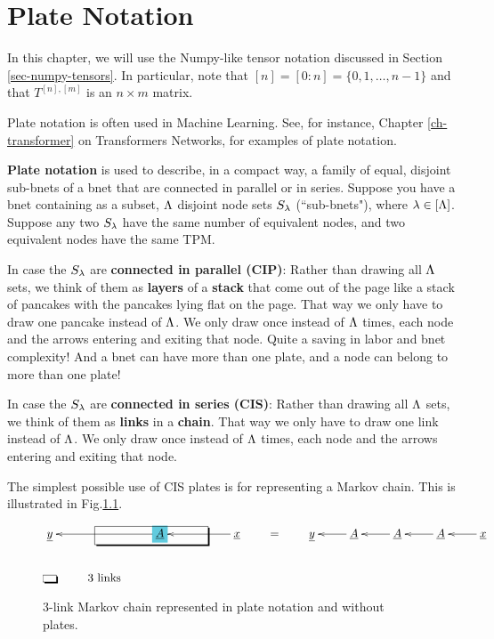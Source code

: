 \chapter{Plate Notation}
\label{ch-plates}

In this chapter, we
will use the Numpy-like tensor notation
discussed in Section 
\ref{sec-numpy-tensors}. In particular, note that $[n] = [0:n] = \{0, 1,\ldots, n-1\}$ and that $T^{[n], [m]}$ is an $n\times m$ matrix.

Plate notation is often used in Machine Learning. See, for instance,
Chapter \ref{ch-transformer} on Transformers Networks, for  examples of plate notation.


{\bf Plate notation} is used to describe, in a compact way, a family of 
equal, disjoint  sub-bnets of a bnet that are connected in parallel or in series.
Suppose you have a bnet containing as a subset, $\Lambda$ disjoint node sets $S_\lambda$ (``sub-bnets"), where
$\lambda\in [\Lambda]$. Suppose
any two $S_\lambda$ have the same number of equivalent nodes,
and two equivalent nodes have the same TPM.

In case the $S_\lambda$ are {\bf connected in parallel (CIP)}:
Rather than drawing all $\Lambda$ sets, 
we think of them as {\bf layers} of a {\bf stack}
that come out of the page like a stack of pancakes with the pancakes
lying flat on the page.
That way we only have to draw one pancake instead of $\Lambda$.
We only draw once instead of $\Lambda$ times, each node and the arrows entering and exiting
that node. Quite a saving in labor and bnet complexity! 
And a bnet can have more 
than one plate, and a node can belong
to more than one plate!

In case the $S_\lambda$ are {\bf connected in series (CIS)}: Rather than drawing all $\Lambda$ sets, 
we think of them as {\bf links} in a {\bf chain}.
That way we only have to draw one link instead of $\Lambda$.
We only draw once instead of $\Lambda$ times, each node and the arrows entering and exiting
that node. 


The simplest possible use
of CIS plates is for representing
a Markov chain. This is
illustrated in  Fig.\ref{fig-texnn-for-markov}.
\begin{figure}[h!]\centering
$$\xymatrix{
{\underline{y}}&&*+[F*:SkyBlue]{\underline{A}}\ar[ll]&&{\underline{x}}\ar[ll]
\save
\POS"1,2"."1,2"."1,4"."1,4"!C*+<1.0em>\frm{-,}
\restore
\\
*+[F-,]{\;\;}&\text{$3$ links}
} \quad\quad=\quad\quad \xymatrix{\rvy & \rvA\ar[l] &\rvA\ar[l] &\rvA\ar[l] & \rvx\ar[l]}$$
\caption{3-link Markov chain represented in plate notation
and without plates.}
\label{fig-texnn-for-markov}
\end{figure}


